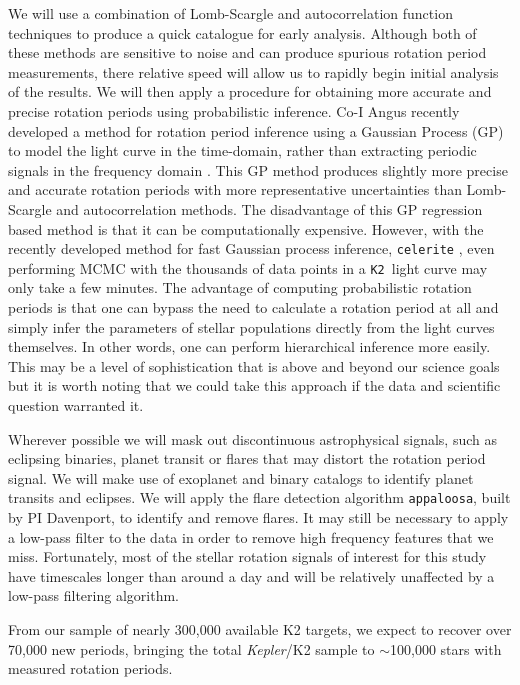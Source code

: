 \documentclass[12pt]{article}
\newcommand{\Kepler}{\textsl{Kepler}\xspace}
\newcommand{\ktwo}{{\tt K2}}
\begin{document}
We will use a combination of Lomb-Scargle and autocorrelation function
techniques to produce a quick catalogue for early analysis.
Although both of these methods are sensitive to noise and can produce spurious
rotation period measurements, there relative speed will allow us to rapidly
begin initial analysis of the results.
We will then apply a procedure for obtaining more accurate and precise
rotation periods using probabilistic inference.
Co-I Angus recently developed a method for rotation period inference using a
Gaussian Process (GP) to model the light curve in the time-domain, rather than
extracting periodic signals in the frequency domain \citet{angus2016c}.
This GP method produces slightly more precise and accurate rotation periods
with more representative uncertainties than Lomb-Scargle and autocorrelation
methods.
The disadvantage of this GP regression based method is that it can be
computationally expensive.
However, with the recently developed method for fast Gaussian process
inference, {\tt celerite} \citep{foreman-mackey2017}, even performing MCMC
with the thousands of data points in a \ktwo\ light curve may only take a few
minutes.
The advantage of computing probabilistic rotation periods is that one can
bypass the need to calculate a rotation period at all and simply infer the
parameters of stellar populations directly from the light curves themselves.
In other words, one can perform hierarchical inference more easily.
This may be a level of sophistication that is above and beyond our science
goals but it is worth noting that we could take this approach if the data and
scientific question warranted it.

Wherever possible we will mask out discontinuous astrophysical signals, such as
eclipsing binaries, planet transit or flares that may distort the rotation
period signal.
We will make use of exoplanet and binary catalogs to identify planet transits
and eclipses.
We will apply the flare detection algorithm {\tt appaloosa}, built by PI
Davenport, to identify and remove flares.
It may still be necessary to apply a low-pass filter to the data in order to
remove high frequency features that we miss.
Fortunately, most of the stellar rotation signals of interest for this study
have timescales longer than around a day and will be relatively unaffected by
a low-pass filtering algorithm.

From our sample of nearly 300,000 available K2 targets, we expect to recover
over 70,000 new periods, bringing the total \Kepler/K2 sample to $\sim$100,000
stars with measured rotation periods.
\end{document}
